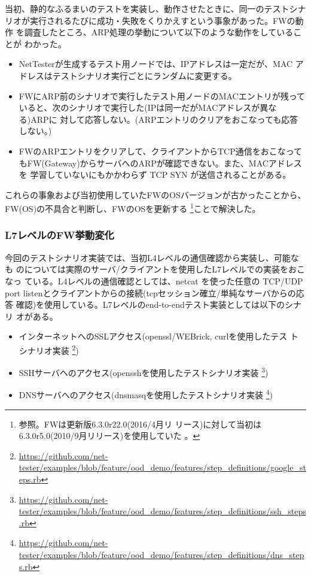 当初、静的なふるまいのテストを実装し、動作させたときに、同一のテストシナ
リオが実行されるたびに成功・失敗をくりかえすという事象があった。FWの動作
を調査したところ、ARP処理の挙動について以下のような動作をしていることが
わかった。
\begin{itemize}
 \item NetTesterが生成するテスト用ノードでは、IPアドレスは一定だが、MAC
       アドレスはテストシナリオ実行ごとにランダムに変更する。
 \item FWにARP前のシナリオで実行したテスト用ノードのMACエントリが残って
       いると、次のシナリオで実行した(IPは同一だがMACアドレスが異なる)ARPに
       対して応答しない。(ARPエントリのクリアをおこなっても応答しない。)
 \item FWのARPエントリをクリアして、クライアントからTCP通信をおこなって
       もFW(Gateway)からサーバへのARPが確認できない。また、MACアドレスを
       学習していないにもかかわらず TCP SYN が送信されることがある。
\end{itemize}

これらの事象および当初使用していたFWのOSバージョンが古かったことから、
FW(OS)の不具合と判断し、FWのOSを更新する
\footnote{参照。FWは更新版6.3.0r22.0(2016/4月リ
リース)に対して当初は6.3.0r5.0(2010/9月リリース)を使用していた
\cite{screenos-releases}。}ことで解決した。

   \subsubsection{L7レベルのFW挙動変化}
今回のテストシナリオ実装では、当初L4レベルの通信確認から実装し、可能なも
のについては実際のサーバ/クライアントを使用したL7レベルでの実装をおこなっ
ている。L4レベルの通信確認としては、netcat を使った任意の TCP/UDP port
listenとクライアントからの接続(tcpセッション確立/単純なサーバからの応答
確認)を使用している。L7レベルのend-to-endテスト実装としては以下のシナリ
オがある。
\begin{itemize}
 \item インターネットへのSSLアクセス(openssl/WEBrick, curlを使用したテス
       トシナリオ実装
       \footnote{\url{https://github.com/net-tester/examples/blob/feature/ood_demo/features/step_definitions/google_steps.rb}})
 \item SSHサーバヘのアクセス(opensshを使用したテストシナリオ実装
       \footnote{\url{https://github.com/net-tester/examples/blob/feature/ood_demo/features/step_definitions/ssh_steps.rb}})
 \item DNSサーバへのアクセス(dnsmasqを使用したテストシナリオ実装
       \footnote{\url{https://github.com/net-tester/examples/blob/feature/ood_demo/features/step_definitions/dns_steps.rb}})
\end{itemize}

